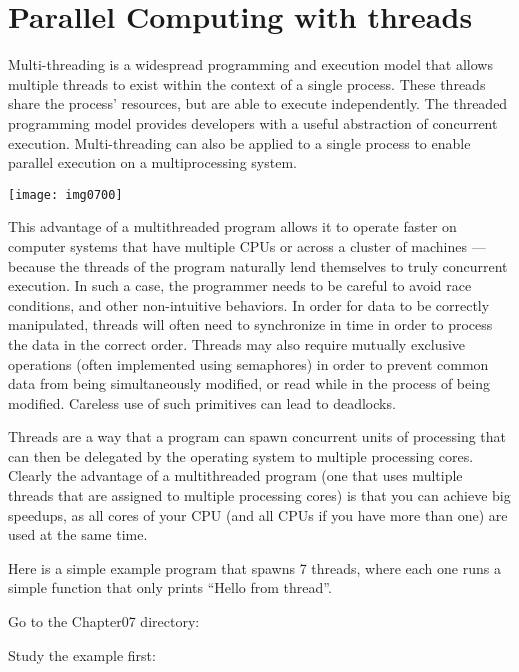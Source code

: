 \section{Parallel Computing with threads}

Multi-threading is a widespread programming and execution model that allows
multiple threads to exist within the context of a single process. These threads
share the process' resources, but are able to execute independently. The
threaded programming model provides developers with a useful abstraction of
concurrent execution. Multi-threading can also be applied to a single process
to enable parallel execution on a multiprocessing system.

\texttt{[image: img0700]}

This advantage of a multithreaded program allows it to operate faster on
computer systems that have multiple CPUs or across a cluster of machines ---
because the threads of the program naturally lend themselves to truly
concurrent execution. In such a case, the programmer needs to be careful to
avoid race conditions, and other non-intuitive behaviors. In order for data to
be correctly manipulated, threads will often need to synchronize in time in
order to process the data in the correct order. Threads may also require
mutually exclusive operations (often implemented using semaphores) in order to
prevent common data from being simultaneously modified, or read while in the
process of being modified. Careless use of such primitives can lead to
deadlocks.

Threads are a way that a program can spawn concurrent units of processing that
can then be delegated by the operating system to multiple processing cores.
Clearly the advantage of a multithreaded program (one that uses multiple
threads that are assigned to multiple processing cores) is that you can achieve
big speedups, as all cores of your CPU (and all CPUs if you have more than one)
are used at the same time.

Here is a simple example program that spawns 7 threads, where each one runs a
simple function that only prints ``Hello from thread''.

Go to the Chapter07 directory:

\begin{prompt}
\end{prompt}

Study the example first:

